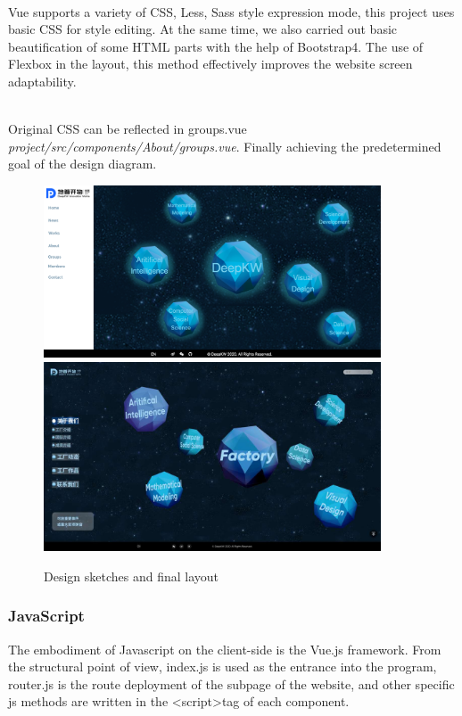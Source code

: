 \documentclass{article}
\begin{document}
~\\
\noindent
Vue supports a variety of CSS, Less, Sass style expression mode, 
this project uses basic CSS for style editing. At the same time, 
we also carried out basic beautification of some HTML parts with 
the help of Bootstrap4. The use of Flexbox in the layout, 
this method effectively improves the website screen adaptability.

~\\
\noindent
Original CSS  can be reflected in groups.vue
\textit{project/src/components/About/groups.vue}. 
Finally achieving the 
predetermined goal of the design diagram.

\begin{figure}[h]
    \centering
    \includegraphics[width=10cm]{img/exp/css.png}
    \includegraphics[width=10cm]{img/05.jpg}
    \caption{Design sketches and final layout}
    \label{}
\end{figure}

\subsubsection{JavaScript}
The embodiment of Javascript on the client-side is the Vue.js framework. 
From the structural point of view, index.js is used as the entrance 
into the program, router.js is the route deployment of the subpage 
of the website, and other specific js methods are written in 
the \textless script\textgreater\space tag of each component.
\end{document}
